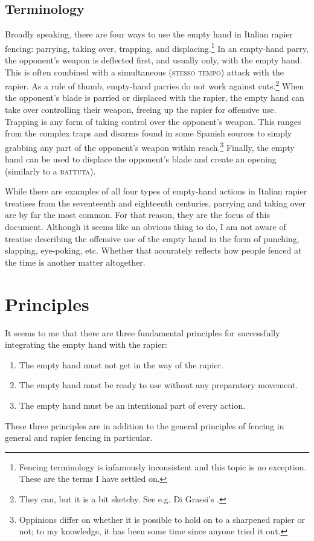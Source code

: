 \documentclass[article, 12pt, a4paper]{memoir}
\begin{document}
\section*{Terminology}
Broadly speaking, there are four ways to use the empty hand in Italian rapier fencing: parrying, taking over, trapping, and displacing.\footnote{Fencing terminology is infamously inconsistent and this topic is no exception. These are the terms I have settled on.}
In an empty-hand parry, the opponent's weapon is deflected first, and usually only, with the empty hand.
This is often combined with a simultaneous (\textsc{stesso tempo}) attack with the rapier.
As a rule of thumb, empty-hand parries do not work against cuts.\footnote{They can, but it is a bit sketchy. See e.g. Di Grassi's .}
When the opponent's blade is parried or displaced with the rapier, the empty hand can take over controlling their weapon, freeing up the rapier for offensive use.
Trapping is any form of taking control over the opponent's weapon.
This ranges from the complex traps and disarms found in some Spanish sources to simply grabbing any part of the opponent's weapon within reach.\footnote{Oppinions differ on whether it is possible to hold on to a sharpened rapier or not; to my knowledge, it has been some time since anyone tried it out.}
Finally, the empty hand can be used to displace the opponent's blade and create an opening (similarly to a \textsc{battuta}).

While there are examples of all four types of empty-hand actions in Italian rapier treatises from the seventeenth and eighteenth centuries, parrying and taking over are by far the most common.
For that reason, they are the focus of this document.
Although it seems like an obvious thing to do, I am not aware of treatise describing the offensive use of the empty hand in the form of punching, slapping, eye-poking, etc.
Whether that accurately reflects how people fenced at the time is another matter altogether.

\chapter{Principles}

It seems to me that there are three fundamental principles for successfully integrating the empty hand with the rapier:
\begin{enumerate}
    \item The empty hand must not get in the way of the rapier.
    \item The empty hand must be ready to use without any preparatory movement.
    \item The empty hand must be an intentional part of every action.
\end{enumerate}
These three principles are in addition to the general principles of fencing in general and rapier fencing in particular.
\end{document}
